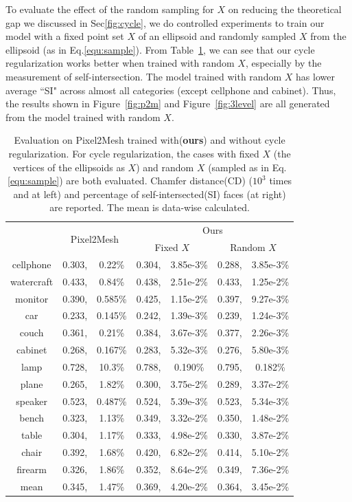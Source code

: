 To evaluate the effect of the random sampling for $X$ on reducing the theoretical gap we discussed in Sec\ref{fig:cycle}, we do controlled experiments to train our model with a fixed point set $X$ of an ellipsoid and randomly sampled $X$ from the ellipsoid (as in Eq.\ref{equ:sample}). From Table~\ref{tab:p2m}, we can see that our cycle regularization works better when trained with random $X$, especially by the measurement of self-intersection. The model trained with random $X$ has lower average ``SI" across almost all categories (except cellphone and cabinet). Thus, the results shown in Figure~\ref{fig:p2m} and Figure~\ref{fig:3level} are all generated from the model trained with random $X$. 
\begin{table}
	\caption{Evaluation on Pixel2Mesh trained with(\textbf{ours}) and without cycle regularization. For cycle regularization, the cases with fixed $X$ (the vertices of the ellipsoids as $X$) and random $X$ (sampled as in Eq.\ref{equ:sample}) are both evaluated. Chamfer distance(CD) ($10^3$ times and at left) and percentage of self-intersected(SI) faces (at right) are reported. The mean is data-wise calculated.}
	\label{tab:p2m}
	\centering
	\begin{tabular}{|c|rc|rc|rc|}
		\hline
		&\multicolumn{2}{c|}{\multirow{2}{*}{Pixel2Mesh}}&\multicolumn{4}{c|}{Ours}\\
		\cline{4-7}
		~&~&~&\multicolumn{2}{c|}{Fixed $X$}&\multicolumn{2}{c|}{Random $X$}\\
		\hline
		cellphone&0.303,&0.22\%&0.304,&3.85e-3\%&0.288,&3.85e-3\%\\
		watercraft&0.433,&0.84\%&0.438,&2.51e-2\%&0.433,&1.25e-2\%\\
		monitor&0.390,&0.585\%&0.425,&1.15e-2\%&0.397,&9.27e-3\%\\
		car&0.233,&0.145\%&0.242,&1.39e-3\%&0.239,&1.24e-3\%\\
		couch&0.361,&0.21\%&0.384,&3.67e-3\%&0.377,&2.26e-3\%\\
		cabinet&0.268,&0.167\%&0.283,&5.32e-3\%&0.276,&5.80e-3\%\\
		lamp&0.728,&10.3\%&0.788,&0.190\%&0.795,&0.182\%\\
		plane&0.265,&1.82\%&0.300,&3.75e-2\%&0.289,&3.37e-2\%\\
		speaker&0.523,&0.487\%&0.524,&5.39e-3\%&0.523,&5.34e-3\%\\
		bench&0.323,&1.13\%&0.349,&3.32e-2\%&0.350,&1.48e-2\%\\
		table&0.304,&1.17\%&0.333,&4.98e-2\%&0.330,&3.87e-2\%\\
		chair&0.392,&1.68\%&0.420,&6.82e-2\%&0.414,&5.10e-2\%\\
		firearm&0.326,&1.86\%&0.352,&8.64e-2\%&0.349,&7.36e-2\%\\
		\hline
		mean &0.345,&1.47\%&0.369,& 4.20e-2\%&0.364,& 3.45e-2\%\\
		\hline
	\end{tabular}
\end{table}
